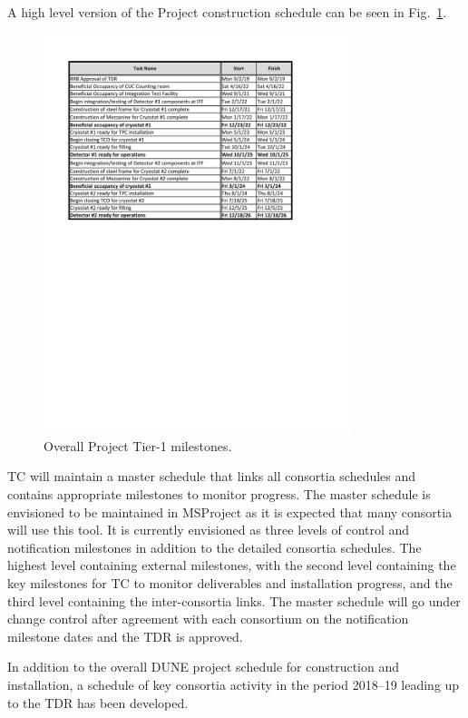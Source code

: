 A high level version of the  Project construction schedule
can be seen in Fig.~\ref{fig:DUNE_schedule}.
\begin{figure}[htb]
  \begin{center}
    \includegraphics[width=0.8\textwidth]{far-detector-generic/figures/FD_Cnst_Schedule}
    \caption{Overall  Project Tier-1 milestones.}
    \label{fig:DUNE_schedule}
  \end{center}
\end{figure}
TC will maintain a master schedule that links all consortia schedules
and contains appropriate milestones to monitor progress. The master
schedule is envisioned to be maintained in MSProject as it is expected
that many consortia will use this tool. It is currently envisioned as
three levels of control and notification milestones in addition to the
detailed consortia schedules. The highest level containing external
milestones, with the second level containing the key milestones for TC
to monitor deliverables and installation progress, and the third level
containing the inter-consortia links. The master schedule will go
under change control after agreement with each consortium on the
notification milestone dates and the TDR is approved.

In addition to the overall DUNE project schedule for construction and
installation, a schedule of key consortia activity in the period
2018--19 leading up to the TDR has been developed.

